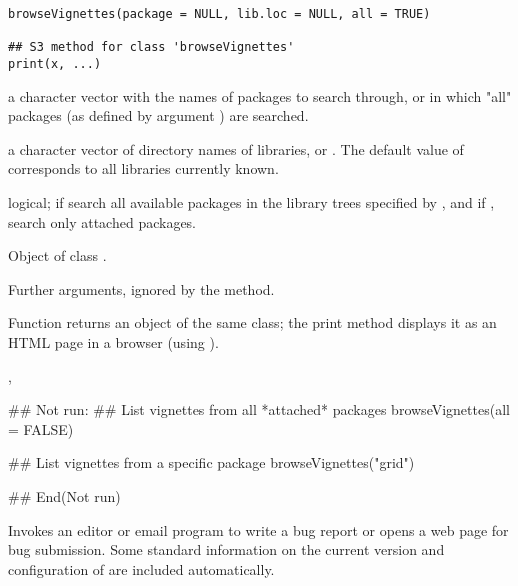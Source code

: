 %
\begin{Usage}
\begin{verbatim}
browseVignettes(package = NULL, lib.loc = NULL, all = TRUE)

## S3 method for class 'browseVignettes'
print(x, ...)
\end{verbatim}
\end{Usage}
%
\begin{Arguments}
\begin{ldescription}
\item[\code{package}] a character vector with the names of packages to
search through, or  in which "all" packages (as defined
by argument ) are searched.
\item[\code{lib.loc}] a character vector of directory names of \R{} libraries,
or .  The default value of  corresponds to all
libraries currently known.
\item[\code{all}] logical; if  search
all available packages in the library trees specified by , 
and if , search only attached packages.
\item[\code{x}] Object of class .
\item[\code{...}] Further arguments, ignored by the  method. 
\end{ldescription}
\end{Arguments}
%
\begin{Details}\relax
Function  returns an object of the same class;
the print method displays it as an HTML page in a browser (using
).
\end{Details}
%
\begin{SeeAlso}\relax
{}, 
\end{SeeAlso}
%
\begin{Examples}
\begin{ExampleCode}
## Not run: 
## List vignettes from all *attached* packages
browseVignettes(all = FALSE)

## List vignettes from a specific package
browseVignettes("grid")

## End(Not run)
\end{ExampleCode}
\end{Examples}
%
\begin{Description}\relax
Invokes an editor or email program to write a bug report or opens a
web page for bug submission.  Some standard information on the current
version and configuration of \R{} are included automatically.
\end{Description}
